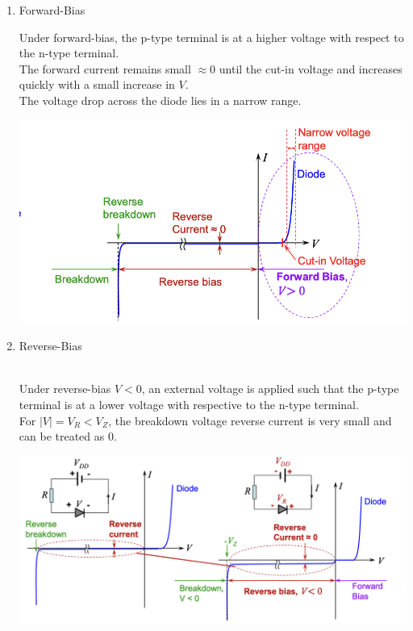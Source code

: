 \begin{enumerate}
\begin{enumerate}
\begin{minipage}{0.6\textwidth}
            \end{minipage}
    \end{enumerate}
    \item Forward-Bias \\
    \begin{minipage}{0.4\textwidth}
        Under forward-bias, the p-type terminal is at a higher voltage with respect to the n-type terminal. \\
        The forward current remains small $\approx 0$ until the cut-in voltage and increases quickly with a small increase in $V$. \\
        The voltage drop across the diode lies in a narrow range.
    \end{minipage}
    \begin{minipage}{0.6\textwidth}
        \includegraphics[width=1\linewidth]{image/diodeforawd.png}
    \end{minipage}
    \item Reverse-Bias \\
    \\
    \begin{minipage}{0.4\textwidth}
        Under reverse-bias $V<0$, an external voltage is applied such that the p-type terminal is at a lower voltage with respective to the n-type terminal. \\       
        For $\displaystyle |V| = V_R < V_Z$, the breakdown voltage reverse current is very small and can be treated as 0.
    \end{minipage}
    \begin{minipage}{0.6\textwidth}
        \includegraphics[width=1\linewidth]{image/reversebias.png}

\end{minipage}
\end{enumerate}
